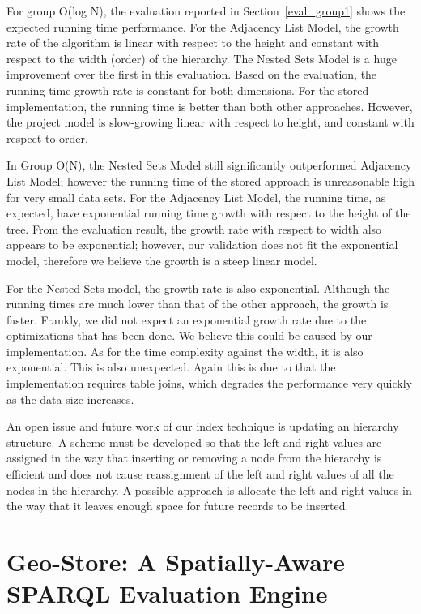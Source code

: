 For group O(log N), the evaluation reported in Section~\ref{eval_group1} shows the expected running time performance. For the Adjacency List Model, the growth rate of the algorithm is linear with respect to the height and constant with respect to the width (order) of the hierarchy. The Nested Sets Model is a huge improvement over the first in this evaluation. Based on the evaluation, the running time growth rate is constant for both dimensions. For the stored implementation, the running time is better than both other approaches. However, the project model is slow-growing linear with respect to height, and constant with respect to order.

In Group O(N), the Nested Sets Model still significantly outperformed Adjacency List Model; however the running time of the stored approach is unreasonable high for very small data sets. For the Adjacency List Model, the running time, as expected, have exponential running time growth with respect to the height of the tree. From the evaluation result, the growth rate with respect to width also appears to be exponential; however, our validation does not fit the exponential model, therefore we believe the growth is a steep linear model.

For the Nested Sets model, the growth rate is also exponential. Although the running times are much lower than that of the other approach, the growth is faster. Frankly, we did not expect an exponential growth rate due to the optimizations that has been done. We believe this could be caused by our implementation. As for the time complexity against the width, it is also exponential. This is also unexpected. Again this is due to that the implementation requires table joins, which degrades the performance very quickly as the data size increases.

An open issue and future work of our index technique is updating an hierarchy structure. A scheme must be developed so that the left and right values are assigned in the way that inserting or removing a node from the hierarchy is efficient and does not cause reassignment of the left and right values of all the nodes in the hierarchy. A possible approach is allocate the left and right values in the way that it leaves enough space for future records to be inserted.

\section{Geo-Store: A Spatially-Aware SPARQL Evaluation Engine}
